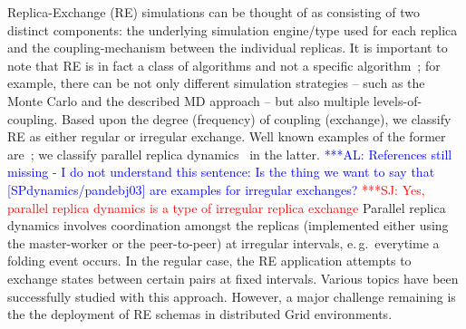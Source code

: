 \documentclass[times, 10pt, twocolumn]{article}
\newcommand{\alnote}[1]{ {\textcolor{blue} { ***AL: #1 }}}
\newcommand{\jhanote}[1]{ {\textcolor{red} { ***SJ: #1 }}}
\newcommand{\alnote}[1]{}
\newcommand{\jhanote}[1]{}
\begin{document}
Replica-Exchange (RE) simulations can be thought of as consisting of
two distinct components: the underlying simulation engine/type used
for each replica and the coupling-mechanism between the individual
replicas.  It is important to note that RE is in fact a class of
algorithms and not a specific algorithm~\cite{dpa_surveypaper}; for
example, there can be not only different simulation strategies -- such
as the Monte Carlo and the described MD approach -- but also multiple
levels-of-coupling.  Based upon the degree (frequency) of coupling
(exchange), we classify RE as either regular or irregular
exchange. Well known examples of the former
are~\cite{hansmann,Sugita:1999rm}; we classify parallel replica
dynamics~\cite{SPdynamics,pande_bj03} in the latter.
\alnote{References still missing - I do not understand this sentence:
  Is the thing we want to say that [SPdynamics/pandebj03] are examples
  for irregular exchanges?}  \jhanote{Yes, parallel replica dynamics
  is a type of irregular replica exchange} Parallel replica dynamics
involves coordination amongst the replicas (implemented either using
the master-worker or the peer-to-peer) at irregular intervals, e.\,g.\
everytime a folding event occurs. In the regular case, the RE
application attempts to exchange states between certain pairs at fixed
intervals. Various topics have been successfully studied with this
approach. However, a major challenge remaining is the the deployment
of RE schemas in distributed Grid environments.
          

\end{document}
